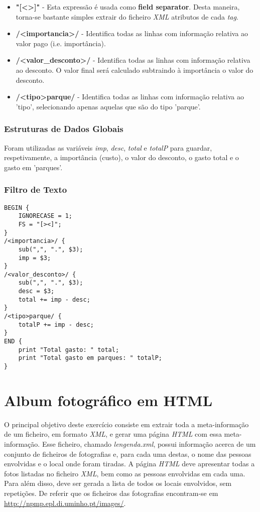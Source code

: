\documentclass{article}
\begin{document}
\begin{itemize}
    \item \textbf{"[\textless\textgreater]"} - Esta expressão é usada como \textbf{field separator}. Desta maneira, torna-se bastante simples extrair do ficheiro \emph{XML} atributos de cada \emph{tag}.
    \item \textbf{/\textless importancia\textgreater/} - Identifica todas as linhas com informação relativa ao valor pago (i.e. importância).
    \item \textbf{/\textless valor\_desconto\textgreater/} - Identifica todas as linhas com informação relativa ao desconto. O valor final será calculado subtraindo à importância o valor do desconto.
    \item \textbf{/\textless tipo\textgreater parque/} - Identifica todas as linhas com informação relativa ao 'tipo', selecionando apenas aquelas que são do tipo 'parque'.
\end{itemize}

\subsubsection{Estruturas de Dados Globais}

Foram utilizadas as variáveis \emph{imp}, \emph{desc}, \emph{total} e \emph{totalP} para guardar, respetivamente, a importância (custo), o valor do desconto, o gasto total e o gasto em 'parques'.

\subsubsection{Filtro de Texto}

\begin{lstlisting}
BEGIN {
	IGNORECASE = 1;
	FS = "[><]";
}
/<importancia>/ {
	sub(",", ".", $3);
	imp = $3;
}
/<valor_desconto>/ {
	sub(",", ".", $3);
	desc = $3;
	total += imp - desc;
}
/<tipo>parque/ {
	totalP += imp - desc;
}
END {
	print "Total gasto: " total;
	print "Total gasto em parques: " totalP;
}
\end{lstlisting}


\section{Album fotográfico em HTML}

O principal objetivo deste exercício consiste em extrair toda a meta-informação de um ficheiro, em formato \emph{XML}, e gerar uma página \emph{HTML} com essa meta-informação. Esse ficheiro, chamado \emph{lengenda.xml}, possui informação acerca de um conjunto de ficheiros de fotografias e, para cada uma destas, o nome das pessoas envolvidas e o local onde foram tiradas. A página \emph{HTML} deve apresentar todas a fotos listadas no ficheiro \emph{XML}, bem como as pessoas envolvidas em cada uma. Para além disso, deve ser gerada a lista de todos os locais envolvidos, sem repetições. De referir que os ficheiros das fotografias encontram-se em \url{http://npmp.epl.di.uminho.pt/images/}.
\end{document}
